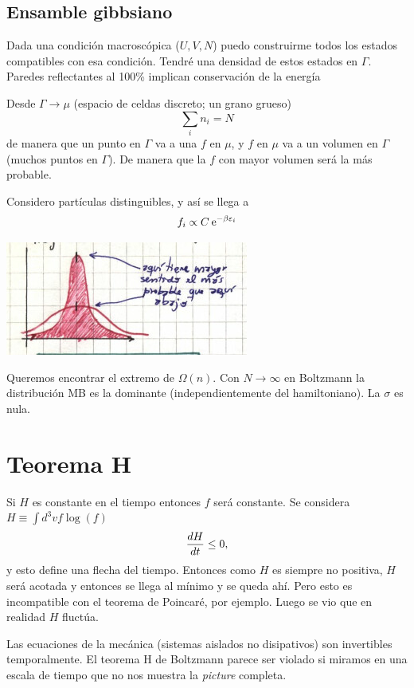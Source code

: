 \documentclass[10pt,oneside]{CBFT_book}
\begin{document}
\subsection{Ensamble gibbsiano}

Dada una condición macroscópica ($U,V,N$) puedo construirme todos los estados compatibles con esa condición.
Tendré una densidad de estos estados en $\Gamma$.
Paredes reflectantes al 100\% implican conservación de la energía

Desde $\Gamma \to \mu$ (espacio de celdas discreto; un grano grueso)
\[
	\sum_i n_i = N
\]
de manera que un punto en $\Gamma$ va a una $f$ en $\mu$, y $f$ en $\mu$ va a un volumen en $\Gamma$
(muchos puntos en $\Gamma$). De manera que la $f$ con mayor volumen será la más probable.


Considero partículas distinguibles, y así se llega a
\[
	f_i \propto C \:\mathrm{e}^{ - \beta \varepsilon_i }
\]

\includegraphics[scale=0.5]{images/1606329273.jpg}



Queremos encontrar el extremo de $\Omega(n)$. Con $N\to\infty$ en Boltzmann la distribución MB es la dominante
(independientemente del hamiltoniano). La $\sigma$ es nula.

\section{Teorema H}

Si $H$ es constante en el tiempo entonces $f$ será constante. Se considera $H \equiv \int d^3v f \log (f)$
\[
	\frac{d^{\hspace{-0.05em}} {H}}{d {t}^{\hspace{-0.05em}}} \leq 0,
\]
y esto define una flecha del tiempo.
Entonces como $H$ es siempre no positiva, $H$ será acotada y entonces se llega al mínimo y se queda ahí.
Pero esto es incompatible con el teorema de Poincaré, por ejemplo. Luego se vio que en realidad $H$ fluctúa.

Las ecuaciones de la mecánica (sistemas aislados no disipativos) son invertibles temporalmente.
El teorema H de Boltzmann parece ser violado si miramos en una escala de tiempo que no nos muestra
la \textit{picture} completa.
\end{document}
